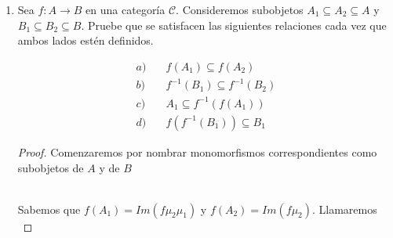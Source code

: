 \documentclass{article}
\begin{document}
\begin{enumerate}[label=\textbf{Ej \arabic*.}]
\begin{proof}
			Sean $\eta: X\to I\cap B'$, \, $\eta_2: X\to A$ tales que $i\eta_1=f\eta_2$.\\
			
			Observamos que, entonces, $\nu_2\eta_1 : X\to B'$ y es tal que $h(\nu_2\eta_1)=i\eta_1=f\eta_2$.\\
			
			Así, como $f^{-1}(B')$ es pull-back de , existe una única $\gamma' : X\to f^{-1}(B')$ tal que 
			$\nu_2\gamma\gamma'=\nu_2\eta_1$ y $\beta_1\gamma'=\eta_2$ pero $\nu_2$ es mono por ser $i$ mono. Entonces 
			$\gamma\gamma'=\eta_1$ y $\beta_1\gamma'=\eta_2$.\\
			
			Ahora, si existiera $\alpha: X\to f^{-1}(B')$ tal que $\beta_1\alpha=\eta_2$ y $\gamma\alpha=\eta_1$, entonces 
			$\nu_2\gamma\alpha=\gamma_2\eta_1$ y por lo anterior $\alpha=\gamma'$ pues es el único con esas propiedades. Por lo tanto 
			$f^{-1}(B')$ es un pull-back, del diagrama (1), e implica que $f^{-1}(I\cap B')$ existe y sea igual a $f^{-1}(B)$ con los morfismos
			$\gamma$ y $\beta_1$.\\
		\end{proof}
		\item Sea $f:A\to B$ en una categoría $\mathscr{C}$. Consideremos subobjetos $A_1\subseteq A_2\subseteq A$ y  $B_1\subseteq B_2\subseteq B$.
		Pruebe que se satisfacen las siguientes relaciones cada vez que ambos lados estén definidos.
		
		\begin{align*}
			a)&\quad f(A_1)\subseteq f(A_2)\\
			b)&\quad f^{-1}(B_1)\subseteq f^{-1}(B_2)\\
			c)&\quad A_1\subseteq f^{-1}(f(A_1))\\
			d)&\quad f(f^{-1}(B_1))\subseteq B_1
		\end{align*}
		
		\begin{proof}
			
			Comenzaremos por nombrar monomorfismos correspondientes como subobjetos de $A$ y de $B$\\
			\centerline{
				}\\
			
			 Sabemos que $f(A_1)=Im(f\mu_2\mu_1)$ y $f(A_2)=Im(f\mu_2)$. Llamaremos \\
			

\end{proof}
\end{enumerate}
\end{document}
